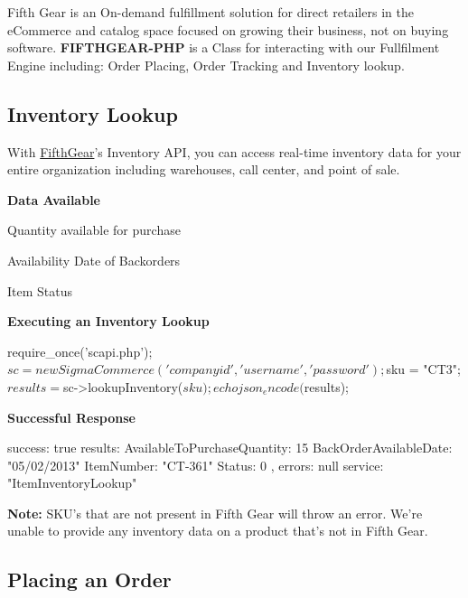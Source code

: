 Fifth Gear is an On-\/demand fulfillment solution for direct retailers in the e\-Commerce and catalog space focused on growing their business, not on buying software. {\bfseries F\-I\-F\-T\-H\-G\-E\-A\-R-\/\-P\-H\-P} is a Class for interacting with our Fullfilment Engine including\-: Order Placing, Order Tracking and Inventory lookup.

\subsection*{Inventory Lookup}

With \hyperlink{class_fifth_gear}{Fifth\-Gear}'s Inventory A\-P\-I, you can access real-\/time inventory data for your entire organization including warehouses, call center, and point of sale.

{\bfseries Data Available}


\begin{DoxyItemize}
\item Quantity available for purchase
\item Availability Date of Backorders
\item Item Status
\end{DoxyItemize}

{\bfseries Executing an Inventory Lookup} \begin{DoxyVerb}require_once('scapi.php');
$sc = new SigmaCommerce('companyid', 'username', 'password');

$sku = "CT3";
$results = $sc->lookupInventory($sku);
echo json_encode($results);
\end{DoxyVerb}


{\bfseries Successful Response} \begin{DoxyVerb}{
    success: true
    results: {
        AvailableToPurchaseQuantity: 15
        BackOrderAvailableDate: "05/02/2013"
        ItemNumber: "CT-361"
        Status: 0
    },
    errors: null
    service: "ItemInventoryLookup"
}
\end{DoxyVerb}


{\bfseries Note\-:} S\-K\-U's that are not present in Fifth Gear will throw an error. We're unable to provide any inventory data on a product that's not in Fifth Gear.

\subsection*{Placing an Order}

